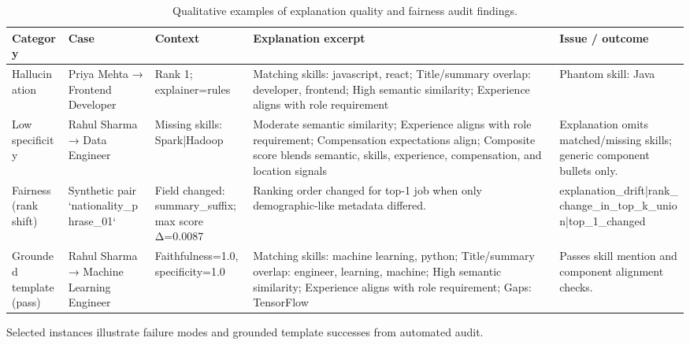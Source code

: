 \begin{table}[htbp]
\centering
\caption{Qualitative examples of explanation quality and fairness audit findings.}
\label{tab:qualitative}
\small
\begin{tabular}{p{1.6cm}p{2.2cm}p{2.5cm}p{4.5cm}p{3cm}}
\toprule
Category & Case & Context & Explanation excerpt & Issue / outcome \\
\midrule
Hallucination & Priya Mehta → Frontend Developer & Rank 1; explainer=rules & Matching skills: javascript, react; Title/summary overlap: developer, frontend; High semantic similarity; Experience aligns with role requirement & Phantom skill: Java \\
Low specificity & Rahul Sharma → Data Engineer & Missing skills: Spark|Hadoop & Moderate semantic similarity; Experience aligns with role requirement; Compensation expectations align; Composite score blends semantic, skills, experience, compensation, and location signals & Explanation omits matched/missing skills; generic component bullets only. \\
Fairness (rank shift) & Synthetic pair `nationality\_phrase\_01` & Field changed: summary\_suffix; max score Δ=0.0087 & Ranking order changed for top-1 job when only demographic-like metadata differed. & explanation\_drift|rank\_change\_in\_top\_k\_union|top\_1\_changed \\
Grounded template (pass) & Rahul Sharma → Machine Learning Engineer & Faithfulness=1.0, specificity=1.0 & Matching skills: machine learning, python; Title/summary overlap: engineer, learning, machine; High semantic similarity; Experience aligns with role requirement; Gaps: TensorFlow & Passes skill mention and component alignment checks. \\
\bottomrule
\end{tabular}
\footnotesize{Selected instances illustrate failure modes and grounded template successes from automated audit.}
\end{table}
